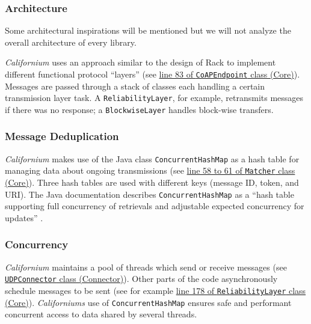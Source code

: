 		\subsubsection{Architecture}


			Some architectural inspirations will be mentioned but we will not
			analyze the overall architecture of every library.

			\emph{Californium} uses an approach similar to the design of Rack
			to implement different functional protocol \enquote{layers} (see
			\href{https://github.com/eclipse/californium/blob/1.0.0-M3/californium-core/src/main/java/org/eclipse/californium/core/network/CoAPEndpoint.java#L83}{line
			83 of \texttt{CoAPEndpoint} class (Core)}). Messages are passed
			through a stack of classes each handling a certain transmission
			layer task. A \texttt{ReliabilityLayer}, for example, retransmits
			messages if there was no response; a \texttt{BlockwiseLayer}
			handles block-wise transfers.

		\subsubsection{Message Deduplication}


			\emph{Californium} makes use of the Java class
			\texttt{ConcurrentHashMap} as a hash table for managing data about
			ongoing transmissions (see
			\href{https://github.com/eclipse/californium/blob/1.0.0-M3/californium-core/src/main/java/org/eclipse/californium/core/network/Matcher.java#L58}{line
			58 to 61 of \texttt{Matcher} class (Core)}). Three hash tables are
			used with different keys (message ID, token, and URI). The Java
			documentation describes \texttt{ConcurrentHashMap} as a
			\enquote{hash table supporting full concurrency of retrievals and
			adjustable expected concurrency for updates}
			\cite{java-concurrenthashmap}.

		\subsubsection{Concurrency}
		\label{cha:background:coap:concurrency}

			\emph{Californium} maintains a pool of threads which send or
			receive messages (see
			\href{https://github.com/eclipse/californium.element-connector/blob/1.0.0-M3/src/main/java/org/eclipse/californium/elements/UDPConnector.java}{\texttt{UDPConnector}
			class (Connector)}). Other parts of the code asynchronously
			schedule messages to be sent (see for example
			\href{https://github.com/eclipse/californium/blob/1.0.0-M3/californium-core/src/main/java/org/eclipse/californium/core/network/stack/ReliabilityLayer.java#L178}{line
			178 of \texttt{ReliabilityLayer} class (Core)}).
			\emph{Californiums} use of \texttt{ConcurrentHashMap} ensures safe
			and performant concurrent access to data shared by several threads.

